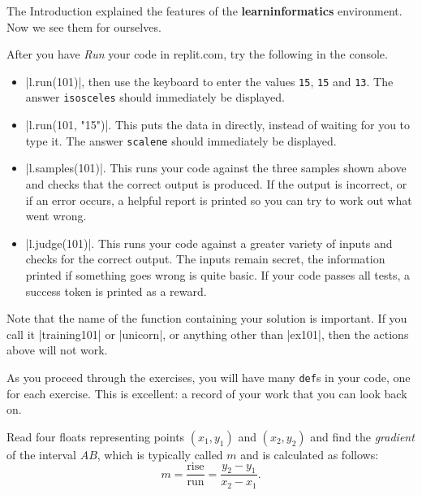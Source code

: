 \Running

The Introduction explained the features of the \textbf{learninformatics} environment. Now
we see them for ourselves.

After you have \emph{Run} your code in replit.com, try the following in the console.
\begin{itemize}
  \item \pycode|l.run(101)|, then use the keyboard to enter the values \texttt{15},
    \texttt{15} and \texttt{13}. The answer \texttt{isosceles} should immediately be
    displayed.
  \item \pycode|l.run(101, "15\n")|. This puts the data in directly, instead of
    waiting for you to type it. The answer \texttt{scalene} should immediately be
    displayed.
  \item \pycode|l.samples(101)|. This runs your code against the three samples shown
    above and checks that the correct output is produced. If the output is incorrect, or
    if an error occurs, a helpful report is printed so you can try to work out what went
    wrong.
  \item \pycode|l.judge(101)|. This runs your code against a greater variety of inputs and
    checks for the correct output. The inputs remain secret, the information printed if
    something goes wrong is quite basic. If your code passes all tests, a success token is
    printed as a reward.
\end{itemize}

Note that the name of the function containing your solution is important. If you call it
\pycode|training101| or \pycode|unicorn|, or anything other than \pycode|ex101|, then the
actions above will not work.

\begin{tcolorbox}
  As you proceed through the exercises, you will have many \texttt{def}s in your code, one
  for each exercise. This is excellent: a record of your work that you can look back on.
\end{tcolorbox}



\clearpage


\Question Read four floats representing points $(x_1,y_1)$ and
$(x_2,y_2)$ and find the \emph{gradient} of the interval $AB$, which is typically called
$m$ and is calculated as follows:
\[ m = \frac{\mathrm{rise}}{\mathrm{run}} = \frac{y_2 - y_1}{x_2 - x_1}.\]

